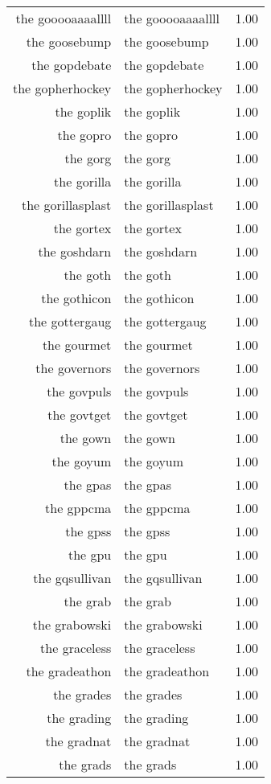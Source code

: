 \begin{table}[ht]
\begin{tabular}{rlr}
  the gooooaaaallll & the gooooaaaallll & 1.00 \\ 
  the goosebump & the goosebump & 1.00 \\ 
  the gopdebate & the gopdebate & 1.00 \\ 
  the gopherhockey & the gopherhockey & 1.00 \\ 
  the goplik & the goplik & 1.00 \\ 
  the gopro & the gopro & 1.00 \\ 
  the gorg & the gorg & 1.00 \\ 
  the gorilla & the gorilla & 1.00 \\ 
  the gorillasplast & the gorillasplast & 1.00 \\ 
  the gortex & the gortex & 1.00 \\ 
  the goshdarn & the goshdarn & 1.00 \\ 
  the goth & the goth & 1.00 \\ 
  the gothicon & the gothicon & 1.00 \\ 
  the gottergaug & the gottergaug & 1.00 \\ 
  the gourmet & the gourmet & 1.00 \\ 
  the governors & the governors & 1.00 \\ 
  the govpuls & the govpuls & 1.00 \\ 
  the govtget & the govtget & 1.00 \\ 
  the gown & the gown & 1.00 \\ 
  the goyum & the goyum & 1.00 \\ 
  the gpas & the gpas & 1.00 \\ 
  the gppcma & the gppcma & 1.00 \\ 
  the gpss & the gpss & 1.00 \\ 
  the gpu & the gpu & 1.00 \\ 
  the gqsullivan & the gqsullivan & 1.00 \\ 
  the grab & the grab & 1.00 \\ 
  the grabowski & the grabowski & 1.00 \\ 
  the graceless & the graceless & 1.00 \\ 
  the gradeathon & the gradeathon & 1.00 \\ 
  the grades & the grades & 1.00 \\ 
  the grading & the grading & 1.00 \\ 
  the gradnat & the gradnat & 1.00 \\ 
  the grads & the grads & 1.00 \\ 

\end{tabular}
\end{table}
